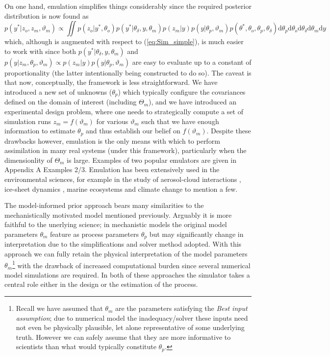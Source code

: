 \documentclass[10pt,a4paper]{article}
\newcommand{\intd} {\textrm{d}}
\begin{document}
On one hand, emulation simplifies things considerably since the required posterior distribution is now found as 
\begin{equation}
p(y^*|z_o,z_m,\vartheta_m) \propto \iint p(z_o | y^*, \theta_o)p(y^* | \theta_\delta, y,\theta_m)p(z_m | y)p(y | \theta_p,\vartheta_m)p(\theta^*,\theta_o, \theta_p, \theta_\delta) \intd \theta_p \intd\theta_o \intd\theta_\delta \intd\theta_m \intd y
\end{equation}
\noindent which, although is augmented with respect to (\ref{eq:Sim_simple}), is much easier to work with since both $p(y^* | \theta_\delta,y,\theta_m)$ and  $p(y | z_m,\theta_p,\vartheta_m) \propto p(z_m | y)p(y | \theta_p,\vartheta_m)$ are easy to evaluate up to a constant of proportionality (the latter intentionally being constructed to do so). The caveat is that now, conceptually, the framework is less straightforward. We have introduced a new set of unknowns ($\theta_p$) which typically configure the covariances defined on the domain of interest (including $\Theta_m$), and we have introduced an experimental design problem, where one needs to strategically compute a set of simulation runs $z_m = f(\vartheta_m)$ for various $\vartheta_m$ such that we have enough information to estimate $\theta_p$ and thus establish our belief on $f(\vartheta_m)$. Despite these drawbacks however, emulation is the only means with which to perform assimilation in many real systems (under this framework), particularly when the dimensionlity of $\Theta_m$ is large. Examples of two popular emulators are given in Appendix A Examples 2/3. Emulation has been extensively used in the environmental sciences, for example in the study of aerosol-cloud interactions \citep{Lee_2013}, ice-sheet dynamics \citep{Gladstone_2012, McNeall_2013}, marine ecosystems \citep{Leeds_2013} and climate change \citep{Holden_2013} to mention a few.




The model-informed prior approach bears many similarities to the mechanistically motivated model mentioned previously. Arguably it is more faithful to the unerlying science; in mechanistic models the original model parameters $\theta_m$ feature as process parameters $\theta_p$ but may significantly change in interpretation due to the simplifications and solver method adopted. With this approach we can fully retain the physical interpretation of the model parameters $\theta_m$\footnote{Recall we have assumed that $\theta_m$ are the parameters satisfying the \emph{Best input assumption}; due to numerical model the inadequacy/solver these inputs need not even be physically plausible, let alone representative of some underlying truth. However we can safely assume that they are more informative to scientists than what would typically constitute $\theta_p$.} with the drawback of increased computational burden since several numerical model simulations are required. In both of these approaches the simulator takes a central role either in the design or the estimation of the process. 
\end{document}
